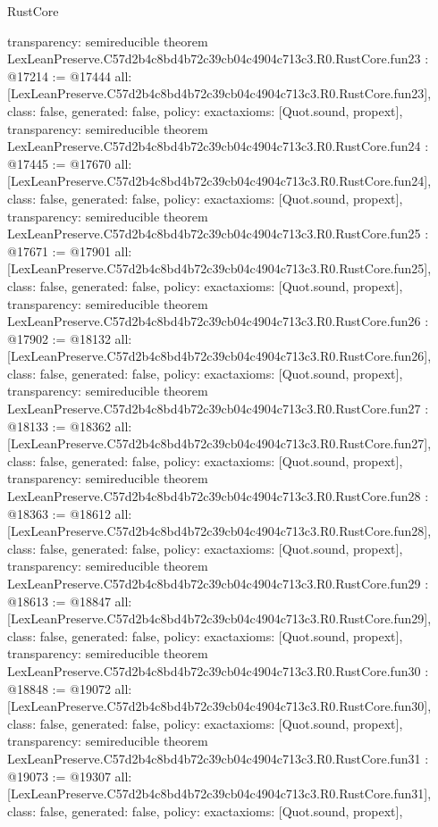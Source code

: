 \begin{lexlean}{RustCore}
\begin{coremodule}
{  transparency: semireducible
}
theorem LexLeanPreserve.C57d2b4c8bd4b72c39cb04c4904c713c3.R0.RustCore.fun23 : @17214 := @17444 {
  all: [LexLeanPreserve.C57d2b4c8bd4b72c39cb04c4904c713c3.R0.RustCore.fun23],
  class: false,
  generated: false,
  policy: exact{axioms: [Quot.sound, propext]},
  transparency: semireducible
}
theorem LexLeanPreserve.C57d2b4c8bd4b72c39cb04c4904c713c3.R0.RustCore.fun24 : @17445 := @17670 {
  all: [LexLeanPreserve.C57d2b4c8bd4b72c39cb04c4904c713c3.R0.RustCore.fun24],
  class: false,
  generated: false,
  policy: exact{axioms: [Quot.sound, propext]},
  transparency: semireducible
}
theorem LexLeanPreserve.C57d2b4c8bd4b72c39cb04c4904c713c3.R0.RustCore.fun25 : @17671 := @17901 {
  all: [LexLeanPreserve.C57d2b4c8bd4b72c39cb04c4904c713c3.R0.RustCore.fun25],
  class: false,
  generated: false,
  policy: exact{axioms: [Quot.sound, propext]},
  transparency: semireducible
}
theorem LexLeanPreserve.C57d2b4c8bd4b72c39cb04c4904c713c3.R0.RustCore.fun26 : @17902 := @18132 {
  all: [LexLeanPreserve.C57d2b4c8bd4b72c39cb04c4904c713c3.R0.RustCore.fun26],
  class: false,
  generated: false,
  policy: exact{axioms: [Quot.sound, propext]},
  transparency: semireducible
}
theorem LexLeanPreserve.C57d2b4c8bd4b72c39cb04c4904c713c3.R0.RustCore.fun27 : @18133 := @18362 {
  all: [LexLeanPreserve.C57d2b4c8bd4b72c39cb04c4904c713c3.R0.RustCore.fun27],
  class: false,
  generated: false,
  policy: exact{axioms: [Quot.sound, propext]},
  transparency: semireducible
}
theorem LexLeanPreserve.C57d2b4c8bd4b72c39cb04c4904c713c3.R0.RustCore.fun28 : @18363 := @18612 {
  all: [LexLeanPreserve.C57d2b4c8bd4b72c39cb04c4904c713c3.R0.RustCore.fun28],
  class: false,
  generated: false,
  policy: exact{axioms: [Quot.sound, propext]},
  transparency: semireducible
}
theorem LexLeanPreserve.C57d2b4c8bd4b72c39cb04c4904c713c3.R0.RustCore.fun29 : @18613 := @18847 {
  all: [LexLeanPreserve.C57d2b4c8bd4b72c39cb04c4904c713c3.R0.RustCore.fun29],
  class: false,
  generated: false,
  policy: exact{axioms: [Quot.sound, propext]},
  transparency: semireducible
}
theorem LexLeanPreserve.C57d2b4c8bd4b72c39cb04c4904c713c3.R0.RustCore.fun30 : @18848 := @19072 {
  all: [LexLeanPreserve.C57d2b4c8bd4b72c39cb04c4904c713c3.R0.RustCore.fun30],
  class: false,
  generated: false,
  policy: exact{axioms: [Quot.sound, propext]},
  transparency: semireducible
}
theorem LexLeanPreserve.C57d2b4c8bd4b72c39cb04c4904c713c3.R0.RustCore.fun31 : @19073 := @19307 {
  all: [LexLeanPreserve.C57d2b4c8bd4b72c39cb04c4904c713c3.R0.RustCore.fun31],
  class: false,
  generated: false,
  policy: exact{axioms: [Quot.sound, propext]},
}
\end{coremodule}
\end{lexlean}
